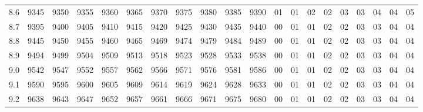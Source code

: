 \documentclass[12pt,UTF8,fontset=none]{ctexbook}
\begin{document}
\begin{appendix}
\begin{longtable}{|c| c c c c c | c c c c c| c c c c c c c c c|}
\scriptsize 8.6 & \scriptsize 9345 & \scriptsize 9350 & \scriptsize 9355 & \scriptsize 9360 & \scriptsize 9365 & \scriptsize 9370 & \scriptsize 9375 & \scriptsize 9380 & \scriptsize 9385 & \scriptsize 9390 & \scriptsize 01 & \scriptsize 01 & \scriptsize 02 & \scriptsize 02 & \scriptsize 03 & \scriptsize 03 & \scriptsize 04 & \scriptsize 04 & \scriptsize 05 \\
\scriptsize 8.7 & \scriptsize 9395 & \scriptsize 9400 & \scriptsize 9405 & \scriptsize 9410 & \scriptsize 9415 & \scriptsize 9420 & \scriptsize 9425 & \scriptsize 9430 & \scriptsize 9435 & \scriptsize 9440 & \scriptsize 00 & \scriptsize 01 & \scriptsize 01 & \scriptsize 02 & \scriptsize 02 & \scriptsize 03 & \scriptsize 03 & \scriptsize 04 & \scriptsize 04 \\
\scriptsize 8.8 & \scriptsize 9445 & \scriptsize 9450 & \scriptsize 9455 & \scriptsize 9460 & \scriptsize 9465 & \scriptsize 9469 & \scriptsize 9474 & \scriptsize 9479 & \scriptsize 9484 & \scriptsize 9489 & \scriptsize 00 & \scriptsize 01 & \scriptsize 01 & \scriptsize 02 & \scriptsize 02 & \scriptsize 03 & \scriptsize 03 & \scriptsize 04 & \scriptsize 04 \\
\scriptsize 8.9 & \scriptsize 9494 & \scriptsize 9499 & \scriptsize 9504 & \scriptsize 9509 & \scriptsize 9513 & \scriptsize 9518 & \scriptsize 9523 & \scriptsize 9528 & \scriptsize 9533 & \scriptsize 9538 & \scriptsize 00 & \scriptsize 01 & \scriptsize 01 & \scriptsize 02 & \scriptsize 02 & \scriptsize 03 & \scriptsize 03 & \scriptsize 04 & \scriptsize 04 \\
\scriptsize 9.0 & \scriptsize 9542 & \scriptsize 9547 & \scriptsize 9552 & \scriptsize 9557 & \scriptsize 9562 & \scriptsize 9566 & \scriptsize 9571 & \scriptsize 9576 & \scriptsize 9581 & \scriptsize 9586 & \scriptsize 00 & \scriptsize 01 & \scriptsize 01 & \scriptsize 02 & \scriptsize 02 & \scriptsize 03 & \scriptsize 03 & \scriptsize 04 & \scriptsize 04 \\
\scriptsize 9.1 & \scriptsize 9590 & \scriptsize 9595 & \scriptsize 9600 & \scriptsize 9605 & \scriptsize 9609 & \scriptsize 9614 & \scriptsize 9619 & \scriptsize 9624 & \scriptsize 9628 & \scriptsize 9633 & \scriptsize 00 & \scriptsize 01 & \scriptsize 01 & \scriptsize 02 & \scriptsize 02 & \scriptsize 03 & \scriptsize 03 & \scriptsize 04 & \scriptsize 04 \\
\scriptsize 9.2 & \scriptsize 9638 & \scriptsize 9643 & \scriptsize 9647 & \scriptsize 9652 & \scriptsize 9657 & \scriptsize 9661 & \scriptsize 9666 & \scriptsize 9671 & \scriptsize 9675 & \scriptsize 9680 & \scriptsize 00 & \scriptsize 01 & \scriptsize 01 & \scriptsize 02 & \scriptsize 02 & \scriptsize 03 & \scriptsize 03 & \scriptsize 04 & \scriptsize 04 \\

\end{longtable}
\end{appendix}
\end{document}
